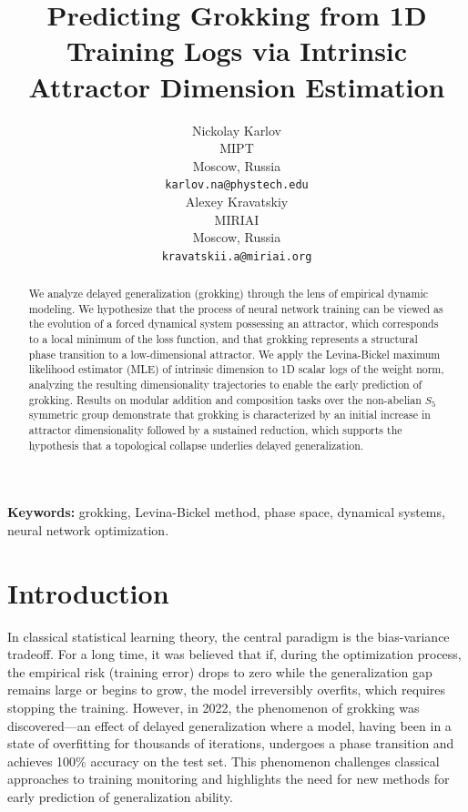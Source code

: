 \documentclass{article}
\title{Predicting Grokking from 1D Training Logs via Intrinsic Attractor Dimension Estimation}
\author{
  Nickolay Karlov\\
  MIPT\\
  Moscow, Russia\\
  \texttt{karlov.na@phystech.edu}\\
  \And
  Alexey Kravatskiy\\
  MIRIAI\\
  Moscow, Russia\\
  \texttt{kravatskii.a@miriai.org}\\
}
\begin{document}
\maketitle

\begin{abstract}
    We analyze delayed generalization (grokking) through the lens of empirical dynamic modeling. We hypothesize that the process of neural network training can be viewed as the evolution of a forced dynamical system possessing an attractor, which corresponds to a local minimum of the loss function, and that grokking represents a structural phase transition to a low-dimensional attractor. We apply the Levina-Bickel maximum likelihood estimator (MLE) of intrinsic dimension to 1D scalar logs of the weight norm, analyzing the resulting dimensionality trajectories to enable the early prediction of grokking. Results on modular addition and composition tasks over the non-abelian  $S_5$ symmetric group demonstrate that grokking is characterized by an initial increase in attractor dimensionality followed by a sustained reduction, which supports the hypothesis that a topological collapse underlies delayed generalization.
\end{abstract}

\textbf{Keywords:} grokking, Levina-Bickel method, phase space, dynamical systems, neural network optimization.


\section{Introduction}\label{sec:intro}

In classical statistical learning theory, the central paradigm is the bias-variance tradeoff. For a long time, it was believed that if, during the optimization process, the empirical risk (training error) drops to zero while the generalization gap remains large or begins to grow, the model irreversibly overfits, which requires stopping the training. However, in 2022, the phenomenon of grokking \citep{power2022grokking} was discovered—an effect of delayed generalization where a model, having been in a state of overfitting for thousands of iterations, undergoes a phase transition and achieves 100\% accuracy on the test set. This phenomenon challenges classical approaches to training monitoring and highlights the need for new methods for early prediction of generalization ability.
\end{document}
